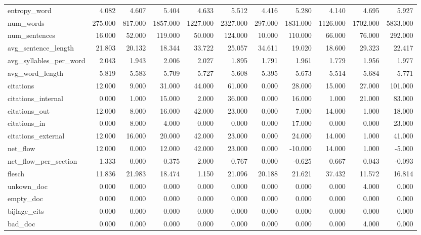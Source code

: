 \begin{tabular}{lrrrrrrrrrr}
\cline{1-11}
entropy\_word & 4.082 & 4.607 & 5.404 & 4.633 & 5.512 & 4.416 & 5.280 & 4.140 & 4.695 & 5.927 \\
\cline{1-11}
num\_words & 275.000 & 817.000 & 1857.000 & 1227.000 & 2327.000 & 297.000 & 1831.000 & 1126.000 & 1702.000 & 5833.000 \\
\cline{1-11}
num\_sentences & 16.000 & 52.000 & 119.000 & 50.000 & 124.000 & 10.000 & 110.000 & 66.000 & 76.000 & 292.000 \\
\cline{1-11}
avg\_sentence\_length & 21.803 & 20.132 & 18.344 & 33.722 & 25.057 & 34.611 & 19.020 & 18.600 & 29.323 & 22.417 \\
\cline{1-11}
avg\_syllables\_per\_word & 2.043 & 1.943 & 2.006 & 2.027 & 1.895 & 1.791 & 1.961 & 1.779 & 1.956 & 1.977 \\
\cline{1-11}
avg\_word\_length & 5.819 & 5.583 & 5.709 & 5.727 & 5.608 & 5.395 & 5.673 & 5.514 & 5.684 & 5.771 \\
\cline{1-11}
citations & 12.000 & 9.000 & 31.000 & 44.000 & 61.000 & 0.000 & 28.000 & 15.000 & 27.000 & 101.000 \\
\cline{1-11}
citations\_internal & 0.000 & 1.000 & 15.000 & 2.000 & 36.000 & 0.000 & 16.000 & 1.000 & 21.000 & 83.000 \\
\cline{1-11}
citations\_out & 12.000 & 8.000 & 16.000 & 42.000 & 23.000 & 0.000 & 7.000 & 14.000 & 1.000 & 18.000 \\
\cline{1-11}
citations\_in & 0.000 & 8.000 & 4.000 & 0.000 & 0.000 & 0.000 & 17.000 & 0.000 & 0.000 & 23.000 \\
\cline{1-11}
citations\_external & 12.000 & 16.000 & 20.000 & 42.000 & 23.000 & 0.000 & 24.000 & 14.000 & 1.000 & 41.000 \\
\cline{1-11}
net\_flow & 12.000 & 0.000 & 12.000 & 42.000 & 23.000 & 0.000 & -10.000 & 14.000 & 1.000 & -5.000 \\
\cline{1-11}
net\_flow\_per\_section & 1.333 & 0.000 & 0.375 & 2.000 & 0.767 & 0.000 & -0.625 & 0.667 & 0.043 & -0.093 \\
\cline{1-11}
flesch & 11.836 & 21.983 & 18.474 & 1.150 & 21.096 & 20.188 & 21.621 & 37.432 & 11.572 & 16.814 \\
\cline{1-11}
unkown\_doc & 0.000 & 0.000 & 0.000 & 0.000 & 0.000 & 0.000 & 0.000 & 0.000 & 4.000 & 0.000 \\
\cline{1-11}
empty\_doc & 0.000 & 0.000 & 0.000 & 0.000 & 0.000 & 0.000 & 0.000 & 0.000 & 0.000 & 0.000 \\
\cline{1-11}
bijlage\_cits & 0.000 & 0.000 & 0.000 & 0.000 & 0.000 & 0.000 & 0.000 & 0.000 & 0.000 & 0.000 \\
\cline{1-11}
bad\_doc & 0.000 & 0.000 & 0.000 & 0.000 & 0.000 & 0.000 & 0.000 & 0.000 & 4.000 & 0.000 \\
\cline{1-11}
\bottomrule
\end{tabular}
